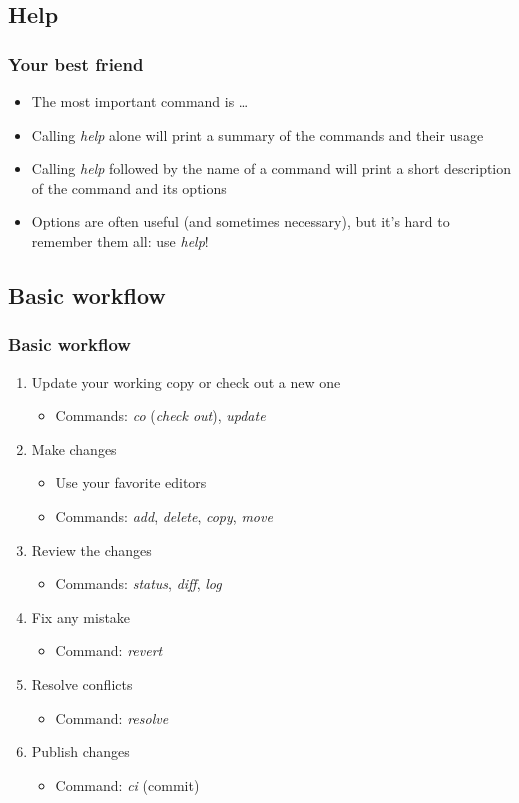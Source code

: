\documentclass{beamer}
\begin{document}
\subsection{Help}

\frame
{
  \frametitle{Your best friend}
  
  \begin{itemize}
  \item<1-> The most important command is \dots
  		  \uncover<2->{\textit{help}}
  \item<3-> Calling \textit{help} alone will print a summary of the commands and their usage
  \item<4-> Calling \textit{help} followed by the name of a command will print a short description of the command and its options
  \item<5-> Options are often useful (and sometimes necessary), but it's hard to remember them all: use \textit{help}!
  \end{itemize}

}

\subsection{Basic workflow}

\frame
{
  \frametitle{Basic workflow}
  
  \begin{enumerate}
  \item<1-> Update your working copy or check out a new one
  	\begin{itemize}
  	\item<1-> Commands: \textit{co} (\textit{check out}), \textit{update}
  	\end{itemize}
  \item<2-> Make changes
  	\begin{itemize}
	\item<2-> Use your favorite editors
	\item<2-> Commands: \textit{add}, \textit{delete}, \textit{copy}, \textit{move}
	\end{itemize}
  \item<3-> Review the changes
  	\begin{itemize}
	\item<3-> Commands: \textit{status}, \textit{diff}, \textit{log}
	\end{itemize}
  \item<4-> Fix any mistake
  	\begin{itemize}
	\item<4-> Command: \textit{revert}
	\end{itemize}
  \item<5-> Resolve conflicts
  	\begin{itemize}
	\item<4-> Command: \textit{resolve}
	\end{itemize}
  \item<6-> Publish changes
  	\begin{itemize}
	\item<4-> Command: \textit{ci} (commit)
	\end{itemize}
  \end{enumerate}

}
\end{document}
